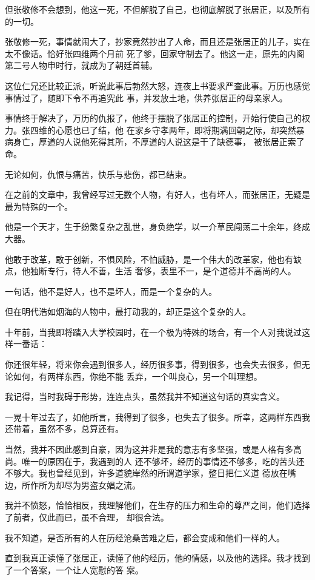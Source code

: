 \documentclass[11pt,a4paper,onecolumn]{article}
\begin{document}
但张敬修不会想到，他这一死，不但解脱了自己，也彻底解脱了张居正，以及所有的一切。

张敬修一死，事情就闹大了，抄家竟然抄出了人命，而且还是张居正的儿子，实在太不像话。恰好张四维两个月前
死了爹，回家守制去了。他这一走，原先的内阁第二号人物申时行，就成为了朝廷首辅。

这位仁兄还比较正派，听说此事后勃然大怒，连夜上书要求严查此事。万历也感觉事情过了，随即下令不再追究此
事，并发放土地，供养张居正的母亲家人。

事情终于解决了，万历的仇报了，他终于摆脱了张居正的控制，开始行使自己的权力。张四维的心愿也已了结，他
在家乡守孝两年，即将期满回朝之际，却突然暴病身亡，厚道的人说他死得其所，不厚道的人说这是干了缺德事，
被张居正索了命。

无论如何，仇恨与痛苦，快乐与悲伤，都已结束。

在之前的文章中，我曾经写过无数个人物，有好人，也有坏人，而张居正，无疑是最为特殊的一个。

他是一个天才，生于纷繁复杂之乱世，身负绝学，以一介草民闯荡二十余年，终成大器。

他敢于改革，敢于创新，不惧风险，不怕威胁，是一个伟大的改革家，他也有缺点，他独断专行，待人不善，生活
奢侈，表里不一，是个道德并不高尚的人。

一句话，他不是好人，也不是坏人，而是一个复杂的人。

但在明代浩如烟海的人物中，最打动我的，却正是这个复杂的人。

十年前，当我即将踏入大学校园时，在一个极为特殊的场合，有一个人对我说过这样一番话：

你还很年轻，将来你会遇到很多人，经历很多事，得到很多，也会失去很多，但无论如何，有两样东西，你绝不能
丢弃，一个叫良心，另一个叫理想。

我记得，当时我碍于形势，连连点头，虽然我并不知道这句话的真实含义。

一晃十年过去了，如他所言，我得到了很多，也失去了很多。所幸，这两样东西我还带着，虽然不多，总算还有。

当然，我并不因此感到自豪，因为这并非是我的意志有多坚强，或是人格有多高尚。唯一的原因在于，我遇到的人
还不够坏，经历的事情还不够多，吃的苦头还不够大。我也曾经见到，许多道貌岸然的所谓道学家，整日把仁义道
德放在嘴边，所作所为却尽为男盗女娼之流。

我并不愤怒，恰恰相反，我理解他们，在生存的压力和生命的尊严之间，他们选择了前者，仅此而已，虽不合理，
却很合法。

我不知道，是否所有的人在历经沧桑苦难之后，都会变成和他们一样的人。

直到我真正读懂了张居正，读懂了他的经历，他的情感，以及他的选择。我才找到了一个答案，一个让人宽慰的答
案。
\end{document}

